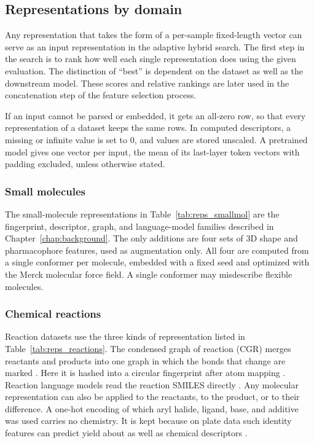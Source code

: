 \subsection{Representations by domain}\label{sec:method:reps}

Any representation that takes the form of a per-sample fixed-length vector can serve as an input representation in the adaptive hybrid search. The first step in the search is to rank how well each single representation does using the given evaluation. The distinction of ``best'' is dependent on the dataset as well as the downstream model. These scores and relative rankings are later used in the concatenation step of the feature selection process. 

If an input cannot be parsed or embedded, it gets an all-zero row, so that every representation of a dataset keeps the same rows. In computed descriptors, a missing or infinite value is set to 0, and values are stored unscaled. A pretrained model gives one vector per input, the mean of its last-layer token vectors with padding excluded, unless otherwise stated. 

\subsubsection{Small molecules}
The small-molecule representations in Table~\ref{tab:reps_smallmol} are the fingerprint, descriptor, graph, and language-model families described in Chapter~\ref{chap:background}. The only additions are four sets of 3D shape and pharmacophore features, used as augmentation only. All four are computed from a single conformer per molecule, embedded with a fixed seed and optimized with the Merck molecular force field. A single conformer may misdescribe flexible molecules.

\subsubsection{Chemical reactions}
Reaction datasets use the three kinds of representation listed in Table~\ref{tab:reps_reactions}. The condensed graph of reaction (CGR) merges reactants and products into one graph in which the bonds that change are marked \citep{Varnek2005, Hoonakker2011}. Here it is hashed into a circular fingerprint after atom mapping \citep{Schwaller2021rxnmapper}. Reaction language models read the reaction SMILES directly \citep{Schwaller2021rxnfp, Sagawa2023ReactionT5}. Any molecular representation can also be applied to the reactants, to the product, or to their difference. A one-hot encoding of which aryl halide, ligand, base, and additive was used carries no chemistry. It is kept because on plate data such identity features can predict yield about as well as chemical descriptors \citep{Chuang2018}.

